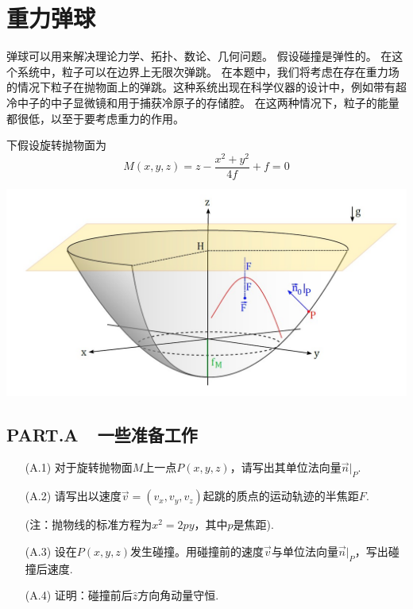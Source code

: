 \documentclass{article}
\begin{document}
\section*{重力弹球}
弹球可以用来解决理论力学、拓扑、数论、几何问题。 假设碰撞是弹性的。  在这个系统中，粒子可以在边界上无限次弹跳。 在本题中，我们将考虑在存在重力场的情况下粒子在抛物面上的弹跳。这种系统出现在科学仪器的设计中，例如带有超冷中子的中子显微镜和用于捕获冷原子的存储腔。 在这两种情况下，粒子的能量都很低，以至于要考虑重力的作用。 \par
下假设旋转抛物面为
\[
M(x,y,z)=z-\dfrac{x^2+y^2}{4f}+f=0
\]
    \begin{center}
    \includegraphics[scale=0.4]{img/0017.1.jpg}\par
    \end{center}

\subsection*{PART.A\ \ 一些准备工作}
\begin{itemize}
    \item[(A.1)]对于旋转抛物面$M$上一点$P(x,y,z)$，请写出其单位法向量$\vec{n}|_P$.
    \item[(A.2)]请写出以速度$\vec{v}=(v_x,v_y,v_z)$起跳的质点的运动轨迹的半焦距$F$.\par (注：抛物线的标准方程为$x^2=2py$，其中$p$是焦距). 
    \item[(A.3)]设在$P(x,y,z)$发生碰撞。用碰撞前的速度$\vec{v}$与单位法向量$\vec{n}|_P$，写出碰撞后速度.
    \item[(A.4)]证明：碰撞前后$\hat{z}$方向角动量守恒. 
\end{itemize}
\end{document}
